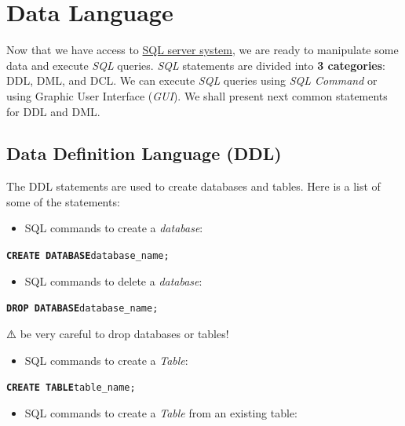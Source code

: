 \documentclass[
  letterpaper,
  DIV=11,
  numbers=noendperiod]{scrreprt}
\providecommand{\tightlist}{%
  \setlength{\itemsep}{0pt}\setlength{\parskip}{0pt}}\usepackage{longtable,booktabs,array}
\begin{document}
\hypertarget{data-language}{%
\section*{Data Language}\label{data-language}}


Now that we have access to
\href{https://argoapps.uwf.edu/vpn/index.html}{SQL server system}, we
are ready to manipulate some data and execute \emph{SQL} queries.
\emph{SQL} statements are divided into \textbf{3 categories}: DDL, DML,
and DCL. We can execute \emph{SQL} queries using \emph{SQL Command} or
using Graphic User Interface (\emph{GUI}). We shall present next common
statements for DDL and DML.

\hypertarget{data-definition-language-ddl}{%
\subsection*{Data Definition Language
(DDL)}\label{data-definition-language-ddl}}

The DDL statements are used to create databases and tables. Here is a
list of some of the statements:

\begin{itemize}
\tightlist
\item
  SQL commands to create a \emph{database}:
\end{itemize}

\textbf{\texttt{CREATE\ DATABASE}}\texttt{database\_name;}

\begin{itemize}
\tightlist
\item
  SQL commands to delete a \emph{database}:
\end{itemize}

\textbf{\texttt{DROP\ DATABASE}}\texttt{database\_name;}

⚠️ be very careful to drop databases or tables!

\begin{itemize}
\tightlist
\item
  SQL commands to create a \emph{Table}:
\end{itemize}

\textbf{\texttt{CREATE\ TABLE}}\texttt{table\_name;}

\begin{itemize}
\tightlist
\item
  SQL commands to create a \emph{Table} from an existing table:
\end{itemize}
\end{document}
